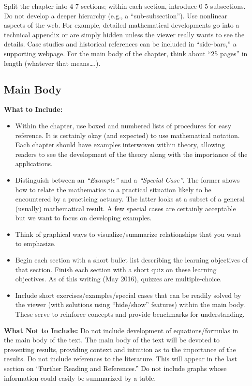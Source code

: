 \documentclass[]{book}
\providecommand{\tightlist}{%
  \setlength{\itemsep}{0pt}\setlength{\parskip}{0pt}}
\theoremstyle{definition}
\theoremstyle{definition}
\theoremstyle{definition}
\theoremstyle{remark}
\begin{document}
Split the chapter into 4-7 sections; within each section, introduce 0-5
subsections. Do not develop a deeper hierarchy (e.g., a
``sub-subsection''). Use nonlinear aspects of the web. For example,
detailed mathematical developments go into a technical appendix or are
simply hidden unless the viewer really wants to see the details. Case
studies and historical references can be included in ``side-bars,'' a
supporting webpage. For the main body of the chapter, think about ``25
pages'' in length (whatever that means\ldots{}.).

\subsection{Main Body}\label{main-body}

\textbf{What to Include:}

\begin{itemize}
\tightlist
\item
  Within the chapter, use boxed and numbered lists of procedures for
  easy reference. It is certainly okay (and expected) to use
  mathematical notation. Each chapter should have examples interwoven
  within theory, allowing readers to see the development of the theory
  along with the importance of the applications.
\item
  Distinguish between an \emph{``Example''} and a \emph{``Special
  Case''}. The former shows how to relate the mathematics to a practical
  situation likely to be encountered by a practicing actuary. The latter
  looks at a subset of a general (usually) mathematical result. A few
  special cases are certainly acceptable but we want to focus on
  developing examples.
\item
  Think of graphical ways to visualize/summarize relationships that you
  want to emphasize.
\item
  Begin each section with a short bullet list describing the learning
  objectives of that section. Finish each section with a short quiz on
  these learning objectives. As of this writing (May 2016), quizzes are
  multiple-choice.
\item
  Include short exercises/examples/special cases that can be readily
  solved by the viewer (with solutions using ``hide/show'' features)
  within the main body. These serve to reinforce concepts and provide
  benchmarks for understanding.
\end{itemize}

\textbf{What Not to Include:} Do not include development of
equations/formulas in the main body of the text. The main body of the
text will be devoted to presenting results, providing context and
intuition as to the importance of the results. Do not include references
to the literature. This will appear in the last section on ``Further
Reading and References.'' Do not include graphs whose information could
easily be summarized by a table.
\end{document}
